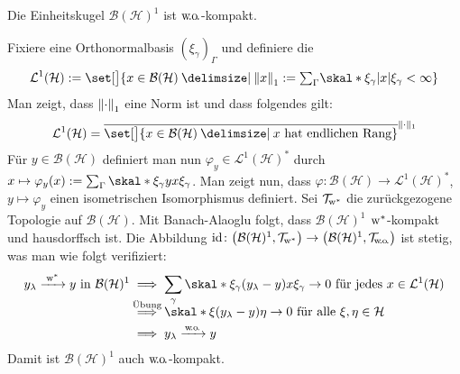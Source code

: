 \begin{satz}[{name=[Einheitskugel der beschränkten Operatoren ist schwach kompakt]}]
	Die Einheitskugel $\mathcal{B}(\mathcal{H})^1$ ist $\wo$-kompakt.
\end{satz}
\begin{beweis}[name={Skizze}]
	Fixiere eine Orthonormalbasis $(\xi_\gamma)_\Gamma$ und definiere die \href{https://de.wikipedia.org/wiki/Spurklasseoperator}{}
	\[
		\mathcal{L}^1(\mathcal{H}) := \set[\big]{x \in \mathcal{B}(\mathcal{H}) \given \norm*{x}_1 := {\textstyle\sum\nolimits_\Gamma} \skal*{\xi_\gamma}{\abs*{x} \xi_\gamma } < \infty} 
	\]
	Man zeigt, dass $\norm*{\cdot}_1$ eine Norm ist und dass folgendes gilt:
	\[
		\mathcal{L}^1(\mathcal{H}) = \overline{\set[\big]{x \in \mathcal{B}(\mathcal{H}) \given x \text{ hat endlichen Rang} }}^{\norm{\cdot }_1}
	\]
	Für $y \in \mathcal{B}(\mathcal{H})$ definiert man nun $\varphi_y \in \mathcal{L}^1(\mathcal{H})^*$ durch $x \mapsto \varphi_y(x) := \sum_\Gamma \skal*{\xi_\gamma}{yx \xi_\gamma}$.
	Man zeigt nun, dass $\varphi \colon \mathcal{B}(\mathcal{H}) \to \mathcal{L}^1(\mathcal{H})^*$, $y \mapsto \varphi_y$ einen isometrischen Isomorphismus definiert. 
	Sei $\TWeakStar$ die zurückgezogene Topologie auf $\mathcal{B}(\mathcal{H})$.
	Mit Banach-Alaoglu folgt, dass $\mathcal{B}(\mathcal{H})^1$ $\w^*$-kompakt und hausdorffsch ist.
	Die Abbildung $\id \colon \enbrace*{\mathcal{B}(\mathcal{H})^1, \TWeakStar} \to \enbrace*{\mathcal{B}(\mathcal{H})^1,\TWeakOp}$ ist stetig, was man wie folgt verifiziert: 
	\begin{align}
		y_\lambda \grenzw{\w^*} y \text{ in } \mathcal{B}(\mathcal{H})^1 &\implies \sum_{\gamma} \skal*{\xi_\gamma}{(y_\lambda-y)x \xi_\gamma} \to 0 \text{ für jedes } x \in \mathcal{L}^1(\mathcal{H}) \\[-.9em]
		&\StackTextClap{Übung}{\implies} \skal*{\xi}{(y_\lambda-y) \eta} \to 0 \text{ für alle } \xi,\eta \in \mathcal{H} \\
		&\implies y_\lambda \grenzw{\wo} y 
	\end{align}
	Damit ist $\mathcal{B}(\mathcal{H})^1$ auch $\wo$-kompakt.
\end{beweis}

